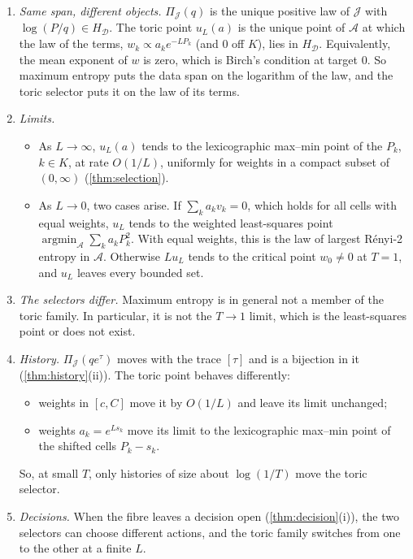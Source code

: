 \documentclass[11pt]{article}
\theoremstyle{definition}\newtheorem{definition}[theorem]{Definition}\newtheorem{remark}[theorem]{Remark}\newtheorem{example}[theorem]{Example}\newtheorem{problem}[theorem]{Open problem}\crefname{problem}{Problem}{Problems}
\begin{document}
\begin{proposition}\label{prop:selectorlink}
\begin{enumerate}
\item[(i)] \emph{Same span, different objects.} $\Pi_{\mathcal J}(q)$ is the unique positive law of $\mathcal J$ with $\log(P/q)\in H_{\mathcal D}$. The toric point $u_L(a)$ is the unique point of $\mathcal A$ at which the law of the terms, $w_k\propto a_ke^{-LP_k}$ (and $0$ off $K$), lies in $H_{\mathcal D}$. Equivalently, the mean exponent of $w$ is zero, which is Birch's condition at target $0$. So maximum entropy puts the data span on the logarithm of the law, and the toric selector puts it on the law of its terms.
\item[(ii)] \emph{Limits.}
\begin{itemize}
\item As $L\to\infty$, $u_L(a)$ tends to the lexicographic max--min point of the $P_k$, $k\in K$, at rate $O(1/L)$, uniformly for weights in a compact subset of $(0,\infty)$ (\cref{thm:selection}).
\item As $L\to0$, two cases arise. If $\sum_ka_kv_k=0$, which holds for all cells with equal weights, $u_L$ tends to the weighted least-squares point $\operatorname{argmin}_{\mathcal A}\sum_ka_kP_k^2$. With equal weights, this is the law of largest R\'enyi-2 entropy in $\mathcal A$. Otherwise $Lu_L$ tends to the critical point $w_0\ne0$ at $T=1$, and $u_L$ leaves every bounded set.
\end{itemize}
\item[(iii)] \emph{The selectors differ.} Maximum entropy is in general not a member of the toric family. In particular, it is not the $T\to1$ limit, which is the least-squares point or does not exist.
\item[(iv)] \emph{History.} $\Pi_{\mathcal J}(qe^\tau)$ moves with the trace $[\tau]$ and is a bijection in it (\cref{thm:history}(ii)). The toric point behaves differently:
\begin{itemize}
\item weights in $[c,C]$ move it by $O(1/L)$ and leave its limit unchanged;
\item weights $a_k=e^{Ls_k}$ move its limit to the lexicographic max--min point of the shifted cells $P_k-s_k$.
\end{itemize}
So, at small $T$, only histories of size about $\log(1/T)$ move the toric selector.
\item[(v)] \emph{Decisions.} When the fibre leaves a decision open (\cref{thm:decision}(i)), the two selectors can choose different actions, and the toric family switches from one to the other at a finite $L$.
\end{enumerate}
\end{proposition}
\end{document}
